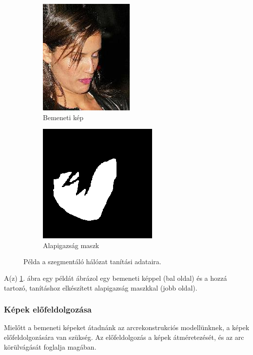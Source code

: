 \documentclass[12pt,a4]{article}
\begin{document}
            \begin{figure}
                \centering
                \begin{subfigure}{.5\textwidth}
                  \centering
                  \includegraphics[width=.4\linewidth]{input-img-for-mask.jpg}
                  \caption{Bemeneti kép}
                \end{subfigure}%
                \begin{subfigure}{.5\textwidth}
                  \centering
                  \includegraphics[width=.4\linewidth]{generated-mask.png}
                  \caption{Alapigazság maszk}
                \end{subfigure}
                \caption{Példa a szegmentáló hálózat tanítási adataira.}
                \label{fig:trainset-mask}
            \end{figure}

             A(z) \ref{fig:trainset-mask}. ábra egy példát ábrázol egy bemeneti képpel (bal oldal) és a hozzá tartozó, tanításhoz elkészített alapigazság maszkkal (jobb oldal).

            \subsubsection{Képek előfeldolgozása}

            Mielőtt a bemeneti képeket átadnánk az arcrekonstrukciós modellünknek, a képek előfeldolgozására van szükség. Az előfeldolgozás a képek átméretezését, és az arc körülvágását foglalja magában.
\end{document}
